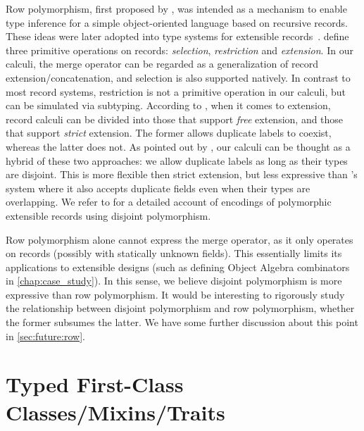 Row polymorphism, first proposed by \citet{wand1987complete}, was intended as a
mechanism to enable type inference for a simple object-oriented language based
on recursive records. These ideas were later adopted into type systems for
extensible records~\citep{Harper:1991:RCB:99583.99603, leijen2005extensible,
  gaster1996polymorphic}. \citet{cardelli1989operations} define three primitive
operations on records: \emph{selection}, \emph{restriction} and
\emph{extension}. In our calculi, the merge operator can be regarded as a
generalization of record extension/concatenation, and selection is also
supported natively. In contrast to most record systems, restriction is not a
primitive operation in our calculi, but can be simulated via subtyping.
According to \citet{leijen2005extensible}, when it comes to extension, record
calculi can be divided into those that support \emph{free} extension, and
those that support \emph{strict} extension. The former allows duplicate labels
to coexist, whereas the latter does not. As pointed out by
\citet{alpuimdisjoint}, our calculi can be thought as a hybrid of these two
approaches: we allow duplicate labels as long as their types are disjoint. This
is more flexible then strict extension, but less expressive than
\citeauthor{leijen2005extensible}'s system where it also accepts duplicate
fields even when their types are overlapping. We refer to \citet{alpuimdisjoint}
for a detailed account of encodings of polymorphic extensible records using
disjoint polymorphism.


Row polymorphism alone cannot express the merge operator, as it only operates on
records (possibly with statically unknown fields). This essentially limits its
applications to extensible designs (such as defining Object Algebra combinators
in \cref{chap:case_study}). In this sense, we believe disjoint polymorphism is
more expressive than row polymorphism. It would be interesting to rigorously
study the relationship between disjoint polymorphism and row polymorphism,
whether the former subsumes the latter. We have some further discussion about
this point in \cref{sec:future:row}.



\section{Typed First-Class Classes/Mixins/Traits}

